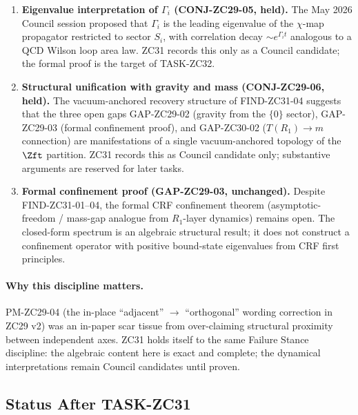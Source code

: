 \documentclass[12pt, a4paper]{article}
\begin{document}
\begin{enumerate}[leftmargin=*, noitemsep]
  \item \textbf{Eigenvalue interpretation of $\Gamma_i$
    (CONJ-ZC29-05, held).}
    The May 2026 Council session proposed that $\Gamma_i$ is
    the leading eigenvalue of the $\chi$-map propagator
    restricted to sector $S_i$, with correlation decay
    $\sim e^{\Gamma_i t}$ analogous to a QCD Wilson loop area
    law. ZC31 records this only as a Council candidate; the
    formal proof is the target of TASK-ZC32.

  \item \textbf{Structural unification with gravity and mass
    (CONJ-ZC29-06, held).}
    The vacuum-anchored recovery structure of FIND-ZC31-04
    suggests that the three open gaps GAP-ZC29-02 (gravity
    from the $\{0\}$ sector), GAP-ZC29-03 (formal confinement
    proof), and GAP-ZC30-02 ($T(R_1) \to m$ connection) are
    manifestations of a single vacuum-anchored topology of
    the $\Zft$ partition. ZC31 records this as Council
    candidate only; substantive arguments are reserved for
    later tasks.

  \item \textbf{Formal confinement proof (GAP-ZC29-03,
    unchanged).}
    Despite FIND-ZC31-01--04, the formal CRF confinement
    theorem (asymptotic-freedom / mass-gap analogue from
    $R_1$-layer dynamics) remains open. The closed-form
    spectrum is an algebraic structural result; it does not
    construct a confinement operator with positive bound-state
    eigenvalues from CRF first principles.
\end{enumerate}

\paragraph{Why this discipline matters.}
PM-ZC29-04 (the in-place ``adjacent'' $\to$ ``orthogonal''
wording correction in ZC29 v2) was an in-paper scar tissue
from over-claiming structural proximity between independent
axes. ZC31 holds itself to the same Failure Stance discipline:
the algebraic content here is exact and complete; the
dynamical interpretations remain Council candidates until
proven.

\subsection{Status After TASK-ZC31}
\label{sec:status}
\end{document}
